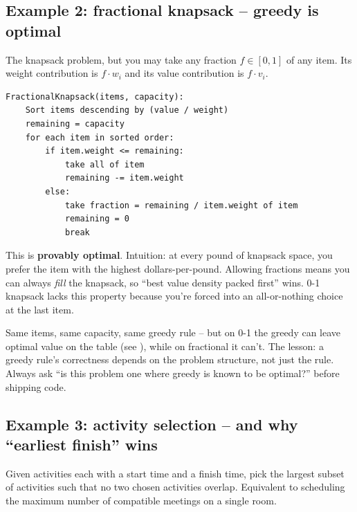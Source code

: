 \documentclass[11pt]{article}
\begin{document}
\subsection{Example 2: fractional knapsack -- greedy is optimal}

\begin{defnbox}
The knapsack problem, but you may take any fraction $f \in [0, 1]$
of any item. Its weight contribution is $f \cdot w_i$ and its value
contribution is $f \cdot v_i$.
\end{defnbox}

\begin{examplebox}
\begin{verbatim}
FractionalKnapsack(items, capacity):
    Sort items descending by (value / weight)
    remaining = capacity
    for each item in sorted order:
        if item.weight <= remaining:
            take all of item
            remaining -= item.weight
        else:
            take fraction = remaining / item.weight of item
            remaining = 0
            break
\end{verbatim}
This is \textbf{provably optimal}. Intuition: at every pound of
knapsack space, you prefer the item with the highest
dollars-per-pound. Allowing fractions means you can always
\emph{fill} the knapsack, so ``best value density packed first'' wins.
0-1 knapsack lacks this property because you're forced into an
all-or-nothing choice at the last item.
\end{examplebox}

\begin{ideabox}
Same items, same capacity, same greedy rule -- but on 0-1 the greedy
can leave optimal value on the table (see ), while on
fractional it can't. The lesson: a greedy rule's correctness depends
on the problem structure, not just the rule. Always ask ``is this
problem one where greedy is known to be optimal?'' before shipping
code.
\end{ideabox}

\subsection{Example 3: activity selection -- and why ``earliest finish'' wins}

\begin{defnbox}
Given activities each with a start time and a finish time, pick the
largest subset of activities such that no two chosen activities
overlap. Equivalent to scheduling the maximum number of compatible
meetings on a single room.
\end{defnbox}
\end{document}
